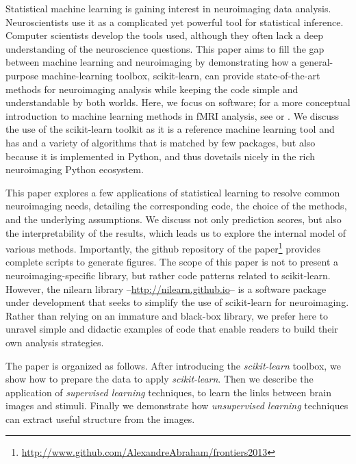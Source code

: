 \documentclass{frontiersSCNS} %
\begin{document}
Statistical machine learning is gaining interest in
neuroimaging data analysis. Neuroscientists use it as a complicated
yet powerful tool for statistical inference. Computer scientists
develop the tools used, although they 
often lack a deep understanding of the neuroscience questions. This paper
aims to fill the gap between machine learning and neuroimaging by demonstrating
how a general-purpose machine-learning toolbox, scikit-learn, can
provide state-of-the-art methods for neuroimaging analysis while keeping
the code simple and
understandable by both worlds. Here, we focus on software; for a 
more conceptual introduction to machine learning methods in fMRI analysis,
see \cite{pereira2009} or \cite{mur2009}.
We discuss the use of the scikit-learn toolkit as it is a reference
machine learning tool and has and a variety of algorithms that is matched by few
packages,
but also because it is implemented in Python,
and thus dovetails nicely in the rich neuroimaging Python ecosystem.

This paper explores a few applications of statistical learning to
resolve common neuroimaging needs, detailing the corresponding code,
the choice of the methods, and the underlying assumptions. We discuss not only
prediction scores, but also the interpretability of the results, which
leads us to explore the internal model of various methods. 
Importantly, the github repository of the
paper\footnote{\url{http://www.github.com/AlexandreAbraham/frontiers2013}}
provides complete scripts to generate figures. 
The scope of this paper is not to present a neuroimaging-specific library,
but rather
code patterns related to scikit-learn. However, the nilearn library --\url{http://nilearn.github.io}-- is a software
package under development
that seeks to simplify the use of scikit-learn for neuroimaging. Rather
than relying on an immature and black-box library, we prefer here to
unravel simple and didactic examples of code that enable readers to
build their own analysis strategies.

The paper is organized as
follows. After introducing the \emph{scikit-learn} toolbox, we show 
how to prepare the data to apply
\emph{scikit-learn}. Then we describe the application of \emph{supervised
learning} techniques, to learn the links between brain images and
stimuli. Finally we demonstrate how \emph{unsupervised learning}
techniques can extract useful structure from the images.

\end{document}
